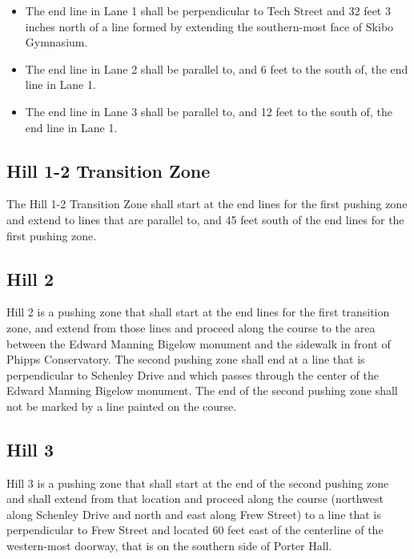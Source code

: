 	\begin{itemize}
	
		\item
		The end line in Lane 1 shall be perpendicular to Tech Street and 32 feet 3
		inches north of a line formed by extending the southern-most face of Skibo
		Gymnasium.

		\item
		The end line in Lane 2 shall be parallel to, and 6 feet to the south of, the
		end line in Lane 1.
		
		\item
		The end line in Lane 3 shall be parallel to, and 12 feet to the south of, the
		end line in Lane 1.

	\end{itemize}

\subsection{Hill 1-2 Transition Zone}

	The Hill 1-2 Transition Zone shall start at the end lines for the first pushing 
	zone and extend to lines that are parallel to, and 45 feet south of the end 
	lines for the first pushing zone.

\subsection{Hill 2}

	Hill 2 is a pushing zone that shall start at the end lines for the first transition 
	zone, and extend from those lines and proceed along the course to the area 
	between the Edward Manning Bigelow monument and the sidewalk in front of Phipps 
	Conservatory. The second pushing zone shall end at a line that is perpendicular to 
	Schenley Drive and which passes through the center of the Edward Manning Bigelow 
	monument. The end of the second pushing zone shall not be marked by a line painted 
	on the course.

\subsection{Hill 3}

	Hill 3 is a pushing zone that shall start at the end of the second pushing zone and 
	shall extend from that location and proceed along the course (northwest along Schenley 
	Drive and north and east along Frew	Street) to a line that is perpendicular to Frew 
	Street and located 60 feet east	of the centerline of the western-most doorway, that is 
	on the southern side of	Porter Hall.


